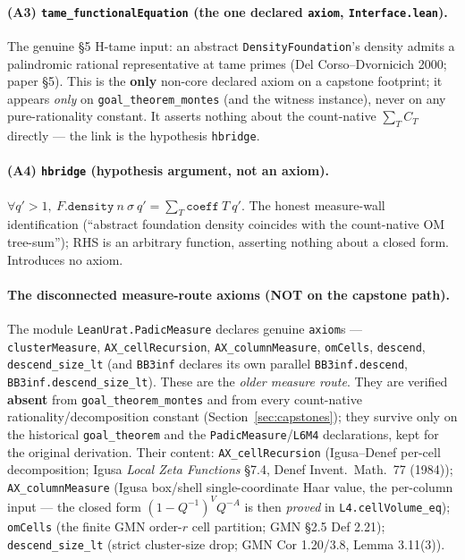 \documentclass[11pt]{article}
\newcommand{\code}[1]{\texttt{#1}}
\begin{document}
\paragraph{(A3) \code{tame\_functionalEquation} (the one declared \code{axiom},
\code{Interface.lean}).} The genuine \S5 H-tame input: an abstract
\code{DensityFoundation}'s density admits a palindromic rational representative at tame
primes (Del Corso--Dvornicich 2000; paper \S5). This is the \textbf{only} non-core
declared axiom on a capstone footprint; it appears \emph{only} on
\code{goal\_theorem\_montes} (and the witness instance), never on any pure-rationality
constant. It asserts nothing about the count-native $\sum_T C_T$ directly --- the link is
the hypothesis \code{hbridge}.

\paragraph{(A4) \code{hbridge} (hypothesis argument, not an axiom).}
$\forall q'>1,\ F.\code{density}\ n\ \sigma\ q' = \sum_T\code{coeff}\ T\ q'$. The honest
measure-wall identification (``abstract foundation density coincides with the
count-native OM tree-sum''); RHS is an arbitrary function, asserting nothing about a
closed form. Introduces no axiom.

\paragraph{The disconnected measure-route axioms (NOT on the capstone path).} The
module \code{LeanUrat.PadicMeasure} declares genuine \code{axiom}s ---
\code{clusterMeasure}, \code{AX\_cellRecursion}, \code{AX\_columnMeasure}, \code{omCells},
\code{descend}, \code{descend\_size\_lt} (and \code{BB3inf} declares its own parallel
\code{BB3inf.descend}, \code{BB3inf.descend\_size\_lt}). These are the \emph{older measure
route}. They are verified \textbf{absent} from \code{goal\_theorem\_montes} and from every
count-native rationality/decomposition constant (Section~\ref{sec:capstones}); they
survive only on the historical \code{goal\_theorem} and the \code{PadicMeasure}/\code{L6M4}
declarations, kept for the original derivation. Their content: \code{AX\_cellRecursion}
(Igusa--Denef per-cell decomposition; Igusa \emph{Local Zeta Functions} \S7.4, Denef
Invent.\ Math.\ 77 (1984)); \code{AX\_columnMeasure} (Igusa box/shell single-coordinate
Haar value, the per-column input --- the closed form $(1-Q^{-1})^V Q^{-A}$ is then
\emph{proved} in \code{L4.cellVolume\_eq}); \code{omCells} (the finite GMN order-$r$ cell
partition; GMN \S2.5 Def 2.21); \code{descend\_size\_lt} (strict cluster-size drop; GMN
Cor 1.20/3.8, Lemma 3.11(3)).
\end{document}

